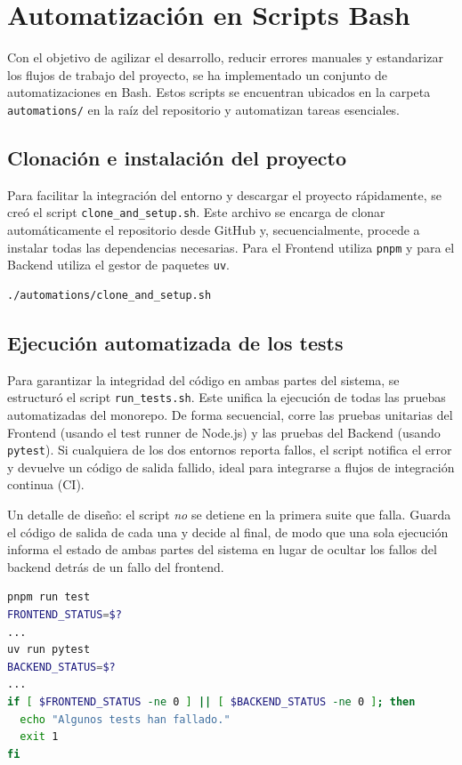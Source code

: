 \section{Automatización en Scripts Bash}
Con el objetivo de agilizar el desarrollo, reducir errores manuales y estandarizar los flujos de trabajo del proyecto, se ha implementado un conjunto de automatizaciones en Bash. Estos scripts se encuentran ubicados en la carpeta \texttt{automations/} en la raíz del repositorio y automatizan tareas esenciales.

\subsection{Clonación e instalación del proyecto}
Para facilitar la integración del entorno y descargar el proyecto rápidamente, se creó el script \texttt{clone\_and\_setup.sh}. Este archivo se encarga de clonar automáticamente el repositorio desde GitHub y, secuencialmente, procede a instalar todas las dependencias necesarias. Para el Frontend utiliza \texttt{pnpm} y para el Backend utiliza el gestor de paquetes \texttt{uv}.

\begin{lstlisting}[language=bash, caption={Comando para clonar y preparar el entorno}]
./automations/clone_and_setup.sh
\end{lstlisting}

\subsection{Ejecución automatizada de los tests}
Para garantizar la integridad del código en ambas partes del sistema, se estructuró el script \texttt{run\_tests.sh}. Este unifica la ejecución de todas las pruebas automatizadas del monorepo. De forma secuencial, corre las pruebas unitarias del Frontend (usando el test runner de Node.js) y las pruebas del Backend (usando \texttt{pytest}). Si cualquiera de los dos entornos reporta fallos, el script notifica el error y devuelve un código de salida fallido, ideal para integrarse a flujos de integración continua (CI).

Un detalle de diseño: el script \emph{no} se detiene en la primera suite que falla. Guarda el código de salida de cada una y decide al final, de modo que una sola ejecución informa el estado de ambas partes del sistema en lugar de ocultar los fallos del backend detrás de un fallo del frontend.

\begin{lstlisting}[language=bash, caption={Agregación de resultados en \texttt{run\_tests.sh}}]
pnpm run test
FRONTEND_STATUS=$?
...
uv run pytest
BACKEND_STATUS=$?
...
if [ $FRONTEND_STATUS -ne 0 ] || [ $BACKEND_STATUS -ne 0 ]; then
  echo "Algunos tests han fallado."
  exit 1
fi
\end{lstlisting}

